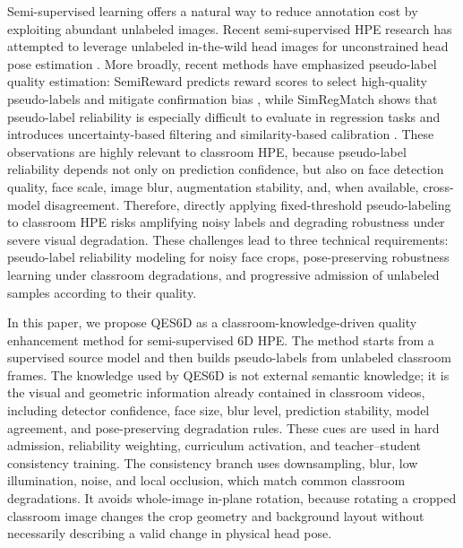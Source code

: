 \documentclass[preprint,12pt]{elsarticle}
\begin{document}
Semi-supervised learning offers a natural way to reduce annotation cost by exploiting abundant unlabeled images. Recent semi-supervised HPE research has attempted to leverage unlabeled in-the-wild head images for unconstrained head pose estimation \cite{zhou2026semiuhpe}. More broadly, recent methods have emphasized pseudo-label quality estimation: SemiReward predicts reward scores to select high-quality pseudo-labels and mitigate confirmation bias \cite{semireward2024}, while SimRegMatch shows that pseudo-label reliability is especially difficult to evaluate in regression tasks and introduces uncertainty-based filtering and similarity-based calibration \cite{simregmatch2024}. These observations are highly relevant to classroom HPE, because pseudo-label reliability depends not only on prediction confidence, but also on face detection quality, face scale, image blur, augmentation stability, and, when available, cross-model disagreement. Therefore, directly applying fixed-threshold pseudo-labeling to classroom HPE risks amplifying noisy labels and degrading robustness under severe visual degradation. These challenges lead to three technical requirements: pseudo-label reliability modeling for noisy face crops, pose-preserving robustness learning under classroom degradations, and progressive admission of unlabeled samples according to their quality.

In this paper, we propose QES6D as a classroom-knowledge-driven quality enhancement method for semi-supervised 6D HPE. The method starts from a supervised source model and then builds pseudo-labels from unlabeled classroom frames. The knowledge used by QES6D is not external semantic knowledge; it is the visual and geometric information already contained in classroom videos, including detector confidence, face size, blur level, prediction stability, model agreement, and pose-preserving degradation rules. These cues are used in hard admission, reliability weighting, curriculum activation, and teacher--student consistency training. The consistency branch uses downsampling, blur, low illumination, noise, and local occlusion, which match common classroom degradations. It avoids whole-image in-plane rotation, because rotating a cropped classroom image changes the crop geometry and background layout without necessarily describing a valid change in physical head pose.
\end{document}

